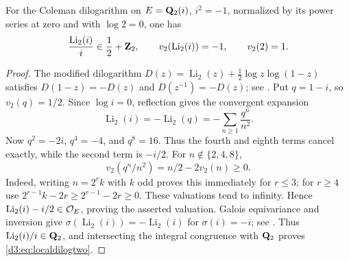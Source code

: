 \begin{lemma}\label{d3:lem:localdilogtwo}
For the Coleman dilogarithm on $E=\mathbf Q_2(i)$, $i^2=-1$, normalized
by its power series at zero and with $\log2=0$, one has
\begin{equation}\label{d3:eq:localdilogtwo}
 \frac{\operatorname{Li}_2(i)}{i}\in\frac12+\mathbf Z_2,
 \qquad v_2(\operatorname{Li}_2(i))=-1,
 \qquad v_2(2)=1.
\end{equation}
\end{lemma}
\begin{proof}
The modified dilogarithm
$D(z)=\operatorname{Li}_2(z)+\frac12\log z\log(1-z)$
satisfies $D(1-z)=-D(z)$ and $D(z^{-1})=-D(z)$;
see \cite[equation~(1.8), p.~307, and p.~377]{BesserDeJeuCurves}.
Put $q=1-i$, so $v_2(q)=1/2$.
Since $\log i=0$, reflection gives the convergent expansion
\[
 \operatorname{Li}_2(i)
 =-\operatorname{Li}_2(q)
 =-\sum_{n\geq1}\frac{q^n}{n^2}.
\]
Now $q^2=-2i$, $q^4=-4$, and $q^8=16$. Thus the fourth and eighth
terms cancel exactly, while the second term is $-i/2$.
For $n\notin\{2,4,8\}$,
\[
 v_2(q^n/n^2)=n/2-2v_2(n)\geq0.
\]
Indeed, writing $n=2^rk$ with $k$ odd proves this immediately
for $r\leq3$; for $r\geq4$ use
$2^{r-1}k-2r\geq2^{r-1}-2r\geq0$.
These valuations tend to infinity. Hence
$\operatorname{Li}_2(i)-i/2\in\mathcal O_E$, proving the asserted valuation.
Galois equivariance and inversion give
$\sigma(\operatorname{Li}_2(i))=-\operatorname{Li}_2(i)$
for $\sigma(i)=-i$; see
\cite[Remark~2.3 and equation~(1.2)]{BesserDeJeu}.
Thus $\operatorname{Li}_2(i)/i\in\mathbf Q_2$, and intersecting the integral
congruence with $\mathbf Q_2$ proves \eqref{d3:eq:localdilogtwo}.
\end{proof}

